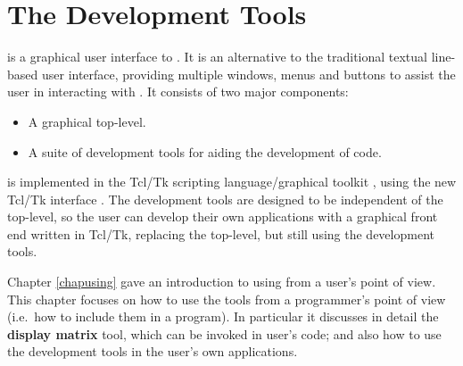 %
% 
% 
% 
% 
\chapter{The {\tkeclipse} Development Tools}
\label{chaptkeclipse}

{\tkeclipse} is a graphical user interface to {\eclipse}. It is an
alternative to the traditional textual line-based user interface, providing
multiple windows, menus and buttons to assist the user in interacting with
{\eclipse}. It consists of two major components:

\begin{itemize}
\item A graphical top-level.
\item A suite of development tools for aiding the development of {\eclipse}
code. 
\end{itemize}

{\tkeclipse} is implemented in the Tcl/Tk scripting language/graphical toolkit
\cite{Tcl94}, using the new {\eclipse} Tcl/Tk interface
\cite{interfaceManual}. The development tools are designed to be
independent of the top-level, so the user can develop their own
applications with a graphical front end written in Tcl/Tk, replacing the
{\tkeclipse} top-level, but still using the development tools.

Chapter \ref{chapusing} gave an introduction to using {\tkeclipse} from a
user's point of view.
This chapter focuses on how to use the tools from a programmer's point of
view (i.e.\ how to include them in a program).
In particular it discusses in detail the {\bf display matrix} tool, which
can be invoked in user's {\eclipse} code; and also how to use the
development tools in the user's own applications.

